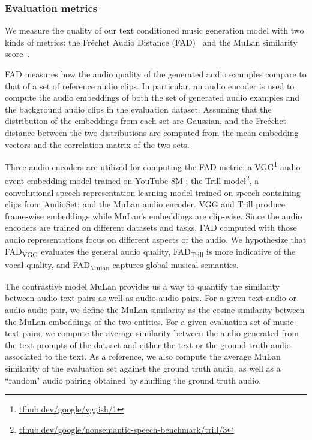 \documentclass[nohyperref]{article}
\theoremstyle{plain}
\theoremstyle{definition}
\theoremstyle{remark}
\begin{document}
\subsubsection{Evaluation metrics} 
We measure the quality of our text conditioned music generation model with two kinds of metrics: the Fr\'echet Audio Distance (FAD)~\cite{kilgour2018fr} and the MuLan similarity score~\cite{mulan2022}. 

FAD measures how the audio quality of the generated audio examples compare to that of a set of reference audio clips.
In particular, an audio encoder is used to compute the audio embeddings of both the set of generated audio examples and the background audio clips in the evaluation dataset. Assuming that the distribution of the embeddings from each set are Gaussian, and the Fre\'echet distance between the two distributions are computed from the mean embedding vectors and the correlation matrix of the two sets.

Three audio encoders are utilized for computing the FAD metric:
a VGG\footnote{\href{https://tfhub.dev/google/vggish/1}{tfhub.dev/google/vggish/1}} audio event embedding model \cite{cnn-for-audio-cls} trained on YouTube-8M \cite{yt8m-data};
the Trill \cite{trill} model\footnote{\href{https://tfhub.dev/google/nonsemantic-speech-benchmark/trill/3}{tfhub.dev/google/nonsemantic-speech-benchmark/trill/3}}, a convolutional speech representation learning model trained on speech containing clips from AudioSet; and the MuLan audio encoder. VGG and Trill produce frame-wise embeddings while MuLan's embeddings are clip-wise. Since the audio encoders are trained on different datasets and tasks, FAD computed with those audio representations focus on different aspects of the audio. We hypothesize that FAD\textsubscript{VGG} evaluates the general audio quality, FAD\textsubscript{Trill} is more indicative of the vocal quality, and FAD\textsubscript{Mulan} captures global musical semantics. 

The contrastive model MuLan provides us a way to quantify the similarity between audio-text pairs as well as audio-audio pairs. For a given text-audio or audio-audio pair, we define the MuLan similarity as the cosine similarity between the MuLan embeddings of the two entities. For a given evaluation set of music-text pairs, we compute the average similarity between the audio generated from the text prompts of the dataset and either the text or the ground truth audio associated to the text.
As a reference, we also compute the average MuLan similarity of the evaluation set against the ground truth audio, as well as a ``random" audio pairing obtained by shuffling the ground truth audio.
\end{document}
